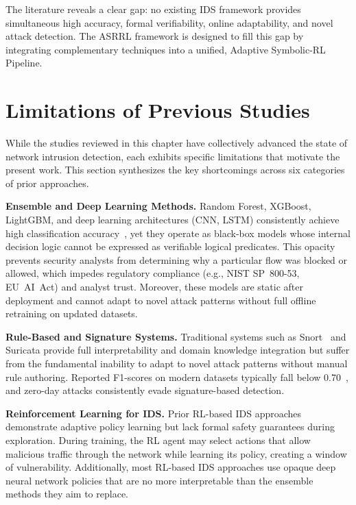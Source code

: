 \documentclass[12pt, letterpaper, oneside]{report}
\newcommand{\ASRRL}{\textsc{ASRRL}}
\begin{document}
The literature reveals a clear gap: no existing IDS framework provides simultaneous high accuracy, formal verifiability, online adaptability, and novel attack detection. The \ASRRL{} framework is designed to fill this gap by integrating complementary techniques into a unified, Adaptive Symbolic-RL Pipeline.

\section{Limitations of Previous Studies}
\label{sec:lit_limitations}

While the studies reviewed in this chapter have collectively advanced the state of network intrusion detection, each exhibits specific limitations that motivate the present work. This section synthesizes the key shortcomings across six categories of prior approaches.

\textbf{Ensemble and Deep Learning Methods.} Random Forest, XGBoost, LightGBM, and deep learning architectures (CNN, LSTM) consistently achieve high classification accuracy~\cite{buczak2016,ahmad2021}, yet they operate as black-box models whose internal decision logic cannot be expressed as verifiable logical predicates. This opacity prevents security analysts from determining why a particular flow was blocked or allowed, which impedes regulatory compliance (e.g., NIST SP~800-53, EU~AI~Act) and analyst trust. Moreover, these models are static after deployment and cannot adapt to novel attack patterns without full offline retraining on updated datasets.

\textbf{Rule-Based and Signature Systems.} Traditional systems such as Snort~\cite{roesch1999} and Suricata provide full interpretability and domain knowledge integration but suffer from the fundamental inability to adapt to novel attack patterns without manual rule authoring. Reported F1-scores on modern datasets typically fall below 0.70~\cite{ahmad2021}, and zero-day attacks consistently evade signature-based detection.

\textbf{Reinforcement Learning for IDS.} Prior RL-based IDS approaches demonstrate adaptive policy learning but lack formal safety guarantees during exploration. During training, the RL agent may select actions that allow malicious traffic through the network while learning its policy, creating a window of vulnerability. Additionally, most RL-based IDS approaches use opaque deep neural network policies that are no more interpretable than the ensemble methods they aim to replace.
\end{document}
